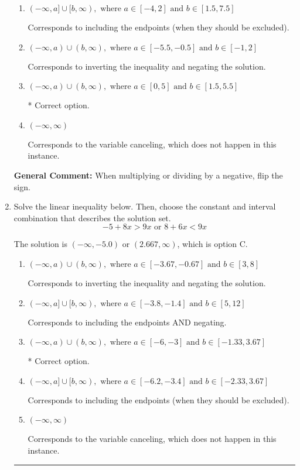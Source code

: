 \documentclass{extbook}[14pt]
\newcommand{\litem}[1]{\item #1

\rule{\textwidth}{0.4pt}}
\begin{document}
\begin{enumerate}
{\begin{enumerate}[label=\Alph*.]
Corresponds to including the endpoints AND negating.
\item \( (-\infty, a] \cup [b, \infty), \text{ where } a \in [-4, 2] \text{ and } b \in [1.5, 7.5] \)

Corresponds to including the endpoints (when they should be excluded).
\item \( (-\infty, a) \cup (b, \infty), \text{ where } a \in [-5.5, -0.5] \text{ and } b \in [-1, 2] \)

Corresponds to inverting the inequality and negating the solution.
\item \( (-\infty, a) \cup (b, \infty), \text{ where } a \in [0, 5] \text{ and } b \in [1.5, 5.5] \)

 * Correct option.
\item \( (-\infty, \infty) \)

Corresponds to the variable canceling, which does not happen in this instance.
\end{enumerate}

\textbf{General Comment:} When multiplying or dividing by a negative, flip the sign.
}
\litem{
Solve the linear inequality below. Then, choose the constant and interval combination that describes the solution set.
\[ -5 + 8 x > 9 x \text{ or } 8 + 6 x < 9 x \]

The solution is \( (-\infty, -5.0) \text{ or } (2.667, \infty) \), which is option C.\begin{enumerate}[label=\Alph*.]
\item \( (-\infty, a) \cup (b, \infty), \text{ where } a \in [-3.67, -0.67] \text{ and } b \in [3, 8] \)

Corresponds to inverting the inequality and negating the solution.
\item \( (-\infty, a] \cup [b, \infty), \text{ where } a \in [-3.8, -1.4] \text{ and } b \in [5, 12] \)

Corresponds to including the endpoints AND negating.
\item \( (-\infty, a) \cup (b, \infty), \text{ where } a \in [-6, -3] \text{ and } b \in [-1.33, 3.67] \)

 * Correct option.
\item \( (-\infty, a] \cup [b, \infty), \text{ where } a \in [-6.2, -3.4] \text{ and } b \in [-2.33, 3.67] \)

Corresponds to including the endpoints (when they should be excluded).
\item \( (-\infty, \infty) \)

Corresponds to the variable canceling, which does not happen in this instance.
\end{enumerate}

}
\end{enumerate}
\end{document}

